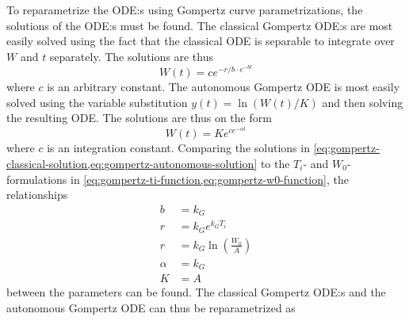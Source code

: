 To reparametrize the ODE:s using Gompertz curve parametrizations, the solutions of the ODE:s must be found.
The classical Gompertz ODE:s  are most easily solved using the fact that the classical ODE is separable to integrate over \(W\) and \(t\) separately.
The solutions are thus
\begin{equation} \label{eq:gompertz-classical-solution}
  W(t) = c e^{-r/b \cdot e^{-b t}}
\end{equation}
where \(c\) is an arbitrary constant.
The autonomous Gompertz ODE  is most easily solved using the variable substitution \(y(t) = \ln(W(t)/K)\) and then solving the resulting ODE.
The solutions are thus on the form
\begin{equation} \label{eq:gompertz-autonomous-solution}
  W(t) = K e^{c e^{-\alpha t}}
\end{equation}
where \(c\) is an integration constant.
Comparing the solutions in \cref{eq:gompertz-classical-solution,eq:gompertz-autonomous-solution} to the \(T_i\)- and \(W_0\)-formulations in \cref{eq:gompertz-ti-function,eq:gompertz-w0-function}, the relationships
\begin{align*}
  b &= k_G\\
  r &= k_G e^{k_G T_i}\\
  r &= k_G \ln(\frac{W_0}{A})\\
  \alpha &= k_G\\
  K &= A
\end{align*}
between the parameters can be found.
The classical Gompertz ODE:s  and the autonomous Gompertz ODE  can thus be reparametrized as

